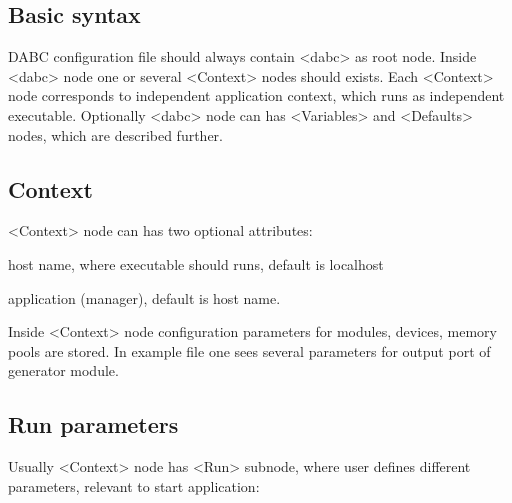 \subsection{Basic syntax}

DABC configuration file should always contain <dabc> as root node. 
Inside <dabc> node one or several <Context> nodes should exists.
Each <Context> node corresponds to independent application context, which runs as
independent executable. 
Optionally <dabc> node can has <Variables> and <Defaults> nodes, which are described further. 

\subsection{Context}

<Context> node can has two optional attributes:
\bdes
\item["host"] host name, where executable should runs, default is localhost
\item["name"] application (manager), default is host name.
\edes

Inside <Context> node configuration parameters for modules, devices, memory pools are stored.
In example file one sees several parameters for output port of generator module.  

\subsection{Run parameters}

Usually <Context> node has <Run> subnode, where user defines different parameters, relevant to start
application:

